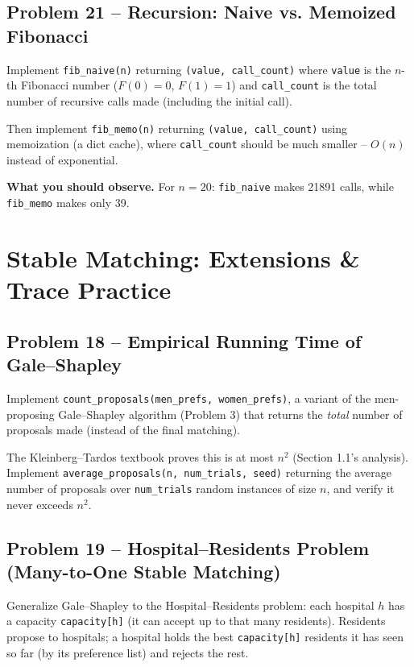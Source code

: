 \documentclass[11pt]{article}
\begin{document}
\subsection*{Problem 21 -- Recursion: Naive vs. Memoized Fibonacci}

Implement \texttt{fib\_naive(n)} returning \texttt{(value, call\_count)} where
\texttt{value} is the $n$-th Fibonacci number ($F(0)=0$, $F(1)=1$) and
\texttt{call\_count} is the total number of recursive calls made (including the initial
call).

Then implement \texttt{fib\_memo(n)} returning \texttt{(value, call\_count)} using
memoization (a dict cache), where \texttt{call\_count} should be much smaller -- $O(n)$
instead of exponential.

\textbf{What you should observe.} For $n=20$: \texttt{fib\_naive} makes 21891 calls, while
\texttt{fib\_memo} makes only 39.

\newpage
\section{Stable Matching: Extensions \& Trace Practice}

\subsection*{Problem 18 -- Empirical Running Time of Gale--Shapley}

Implement \texttt{count\_proposals(men\_prefs, women\_prefs)}, a variant of the
men-proposing Gale--Shapley algorithm (Problem 3) that returns the \emph{total} number of
proposals made (instead of the final matching).

The Kleinberg--Tardos textbook proves this is at most $n^2$ (Section 1.1's analysis).
Implement \texttt{average\_proposals(n, num\_trials, seed)} returning the average number
of proposals over \texttt{num\_trials} random instances of size $n$, and verify it never
exceeds $n^2$.

\subsection*{Problem 19 -- Hospital--Residents Problem (Many-to-One Stable Matching)}

Generalize Gale--Shapley to the Hospital--Residents problem: each hospital $h$ has a
capacity \texttt{capacity[h]} (it can accept up to that many residents). Residents propose
to hospitals; a hospital holds the best \texttt{capacity[h]} residents it has seen so far
(by its preference list) and rejects the rest.
\end{document}
